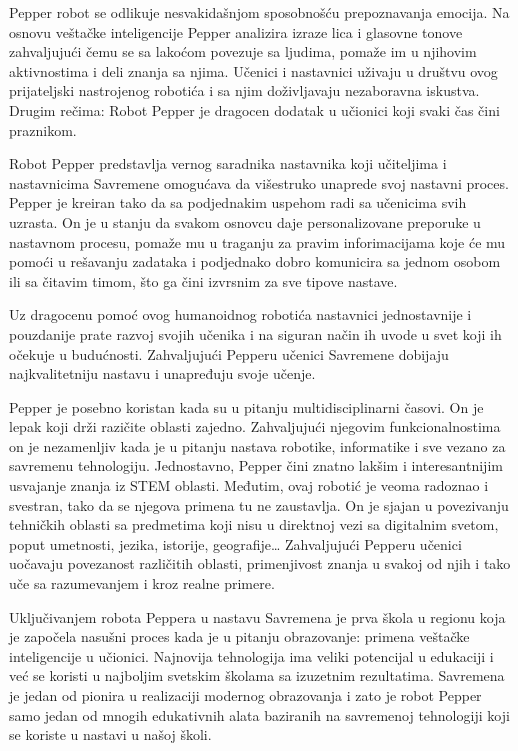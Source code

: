 \documentclass[a4paper]{article}
\begin{document}
Pepper robot se odlikuje nesvakidašnjom sposobnošću prepoznavanja emocija. Na osnovu veštačke inteligencije Pepper analizira izraze lica i glasovne tonove zahvaljujući čemu se sa lakoćom povezuje sa ljudima, pomaže im u njihovim aktivnostima i deli znanja sa njima.
Učenici i nastavnici uživaju u društvu ovog prijateljski nastrojenog robotića i sa njim doživljavaju nezaboravna iskustva.
Drugim rečima: Robot Pepper je dragocen dodatak u učionici koji svaki čas čini praznikom.

Robot Pepper predstavlja vernog saradnika nastavnika koji učiteljima i nastavnicima Savremene omogućava da višestruko unaprede svoj nastavni proces. 
Pepper je kreiran tako da sa podjednakim uspehom radi sa učenicima svih uzrasta. On je u stanju da svakom osnovcu daje personalizovane preporuke u nastavnom procesu, pomaže mu u traganju za pravim inforimacijama koje će mu pomoći u rešavanju zadataka i podjednako dobro komunicira sa jednom osobom ili sa čitavim timom, što ga čini izvrsnim za sve tipove nastave.
 
Uz dragocenu pomoć ovog humanoidnog robotića nastavnici jednostavnije i pouzdanije prate razvoj svojih učenika i na siguran način ih uvode u svet koji ih očekuje u budućnosti.
Zahvaljujući Pepperu učenici Savremene dobijaju najkvalitetniju nastavu i unapređuju svoje učenje.

Pepper je posebno koristan kada su u pitanju multidisciplinarni časovi. On je lepak koji drži razičite oblasti zajedno. Zahvaljujući njegovim funkcionalnostima on je nezamenljiv kada je u pitanju nastava robotike, informatike i sve vezano za savremenu tehnologiju. Jednostavno, Pepper čini znatno lakšim i interesantnijim usvajanje znanja iz STEM oblasti.
Međutim, ovaj robotić je veoma radoznao i svestran, tako da se njegova primena tu ne zaustavlja. On je sjajan u povezivanju tehničkih oblasti sa predmetima koji nisu u direktnoj vezi sa digitalnim svetom, poput umetnosti, jezika, istorije, geografije… Zahvaljujući Pepperu učenici uočavaju povezanost različitih oblasti, primenjivost znanja u svakoj od njih i tako uče sa razumevanjem i kroz realne primere.

Uključivanjem robota Peppera u nastavu Savremena je prva škola u regionu koja je započela nasušni proces kada je u pitanju obrazovanje: primena veštačke inteligencije u učionici. Najnovija tehnologija ima veliki potencijal u edukaciji i već se koristi u najboljim svetskim školama sa izuzetnim rezultatima. 
Savremena je jedan od pionira u realizaciji modernog obrazovanja i zato je robot Pepper samo jedan od mnogih edukativnih alata baziranih na savremenoj tehnologiji koji se koriste u nastavi u našoj školi.
\end{document}
